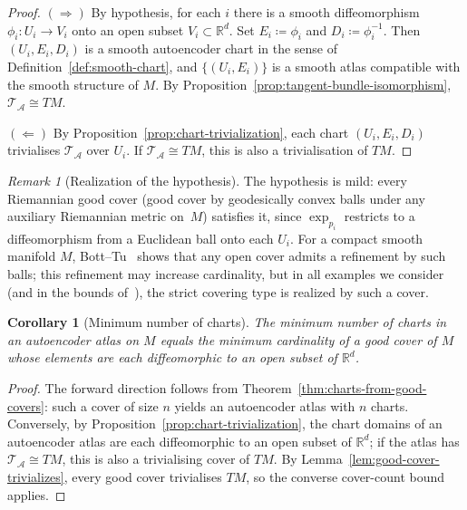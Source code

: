 \documentclass[11pt]{article}
\newcommand{\R}{\mathbb{R}}
\theoremstyle{plain}
\newtheorem{corollary}[theorem]{Corollary}
\theoremstyle{definition}
\theoremstyle{remark}
\newtheorem{remark}[theorem]{Remark}
\begin{document}
\begin{proof}
$(\Rightarrow)$ By hypothesis, for each $i$ there is a smooth diffeomorphism $\phi_i \colon U_i \to V_i$ onto an open subset $V_i \subset \R^d$. Set $E_i \coloneqq \phi_i$ and $D_i \coloneqq \phi_i^{-1}$. Then $(U_i, E_i, D_i)$ is a smooth autoencoder chart in the sense of Definition~\ref{def:smooth-chart}, and $\{(U_i, E_i)\}$ is a smooth atlas compatible with the smooth structure of $M$. By Proposition~\ref{prop:tangent-bundle-isomorphism}, $\mathcal{T}_{\mathcal{A}} \cong TM$.

$(\Leftarrow)$ By Proposition~\ref{prop:chart-trivialization}, each chart $(U_i, E_i, D_i)$ trivialises $\mathcal{T}_{\mathcal{A}}$ over $U_i$. If $\mathcal{T}_{\mathcal{A}} \cong TM$, this is also a trivialisation of $TM$.
\end{proof}
\begin{remark}[Realization of the hypothesis]\label{rem:good-cover-realization}
The hypothesis is mild: every Riemannian good cover (good cover by geodesically convex balls under any auxiliary Riemannian metric on~$M$) satisfies it, since $\exp_{p_i}$ restricts to a diffeomorphism from a Euclidean ball onto each $U_i$. For a compact smooth manifold $M$, Bott--Tu~\cite[Theorem~5.1]{BottTu} shows that any open cover admits a refinement by such balls; this refinement may increase cardinality, but in all examples we consider (and in the bounds of~\cite{Karoubi2017}), the strict covering type is realized by such a cover.
\end{remark}
\begin{corollary}[Minimum number of charts]\label{cor:min-charts}
The minimum number of charts in an autoencoder atlas on $M$ equals the minimum cardinality of a good cover of $M$ whose elements are each diffeomorphic to an open subset of $\R^d$.
\end{corollary}

\begin{proof}
The forward direction follows from Theorem~\ref{thm:charts-from-good-covers}: such a cover of size $n$ yields an autoencoder atlas with $n$ charts. Conversely, by Proposition~\ref{prop:chart-trivialization}, the chart domains of an autoencoder atlas are each diffeomorphic to an open subset of $\R^d$; if the atlas has $\mathcal{T}_{\mathcal{A}} \cong TM$, this is also a trivialising cover of $TM$. By Lemma~\ref{lem:good-cover-trivializes}, every good cover trivialises $TM$, so the converse cover-count bound applies.
\end{proof}
\end{document}
